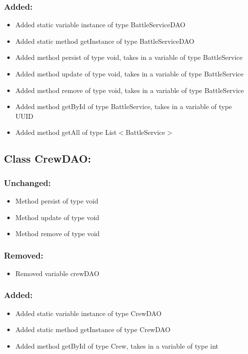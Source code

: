 \documentclass{article}
\begin{document}
\subsubsection{Added:}
\begin{itemize}
\item Added static variable instance of type BattleServiceDAO
\item Added static method getInstance of type BattleServiceDAO
\item Added method persist of type void, takes in a variable of type BattleService
\item Added method update of type void, takes in a variable of type BattleService
\item Added method remove of type void, takes in a variable of type BattleService
\item Added method getById of type BattleService, takes in a variable of type UUID
\item Added method getAll of type List$<$BattleService$>$
\end{itemize}


\subsection{Class CrewDAO:}

\subsubsection{Unchanged:}
\begin{itemize}
\item Method persist of type void
\item Method update of type void
\item Method remove of type void
\end{itemize}

\subsubsection{Removed:}
\begin{itemize}
\item Removed variable crewDAO
\end{itemize}

\subsubsection{Added:}
\begin{itemize}
\item Added static variable instance of type CrewDAO
\item Added static method getInstance of type CrewDAO
\item Added method getById of type Crew, takes in a variable of type int
\end{itemize}
\end{document}
